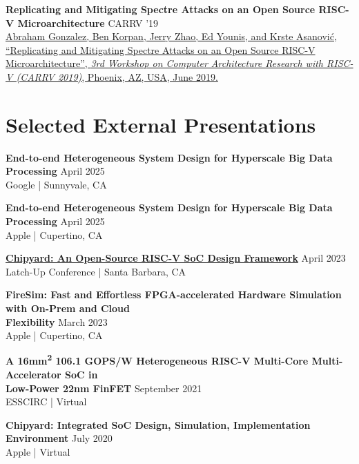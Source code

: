 \documentclass[line]{res}
\begin{document}
\begin{resume}
\label{sec:spectrerepl}
\textbf{Replicating and Mitigating Spectre Attacks on an Open Source RISC-V Microarchitecture} \hfill CARRV '19
\vspace{0.7mm}
\\
\href{https://carrv.github.io/2019/papers/carrv2019_paper_5.pdf}{\underline{Abraham Gonzalez}, Ben Korpan, Jerry Zhao, Ed Younis, and Krste Asanovi\'c, ``Replicating and Mitigating Spectre Attacks on an Open Source RISC-V Microarchitecture'', \textit{3rd Workshop on Computer Architecture Research with RISC-V (CARRV 2019)}, Phoenix, AZ, USA, June 2019.}

\section{\Large{Selected External Presentations}}
\label{sec:talks}
\vspace{2mm}

\textbf{End-to-end Heterogeneous System Design for Hyperscale Big Data Processing} \hfill April 2025
\\
Google | Sunnyvale, CA
\vspace{-1mm}

\textbf{End-to-end Heterogeneous System Design for Hyperscale Big Data Processing} \hfill April 2025
\\
Apple | Cupertino, CA
\vspace{-1mm}

\newpage

\textbf{\href{https://youtu.be/pYyv8BJ5n68?si=EY9vUUn3IQko-ZE3}{Chipyard: An Open-Source RISC-V SoC Design Framework}} \hfill April 2023
\\
Latch-Up Conference | Santa Barbara, CA
\vspace{-1mm}

\textbf{FireSim: Fast and Effortless FPGA-accelerated Hardware Simulation with On-Prem and Cloud\\Flexibility} \hfill March 2023
\\
Apple | Cupertino, CA
\vspace{-1mm}

\textbf{A 16mm\textsuperscript{2} 106.1 GOPS/W Heterogeneous RISC-V Multi-Core Multi-Accelerator SoC in\\Low-Power 22nm FinFET} \hfill September 2021
\\
ESSCIRC | Virtual
\vspace{-1mm}

\textbf{Chipyard: Integrated SoC Design, Simulation, Implementation Environment} \hfill July 2020
\\
Apple | Virtual
\vspace{-1mm}


\end{resume}
\end{document}
